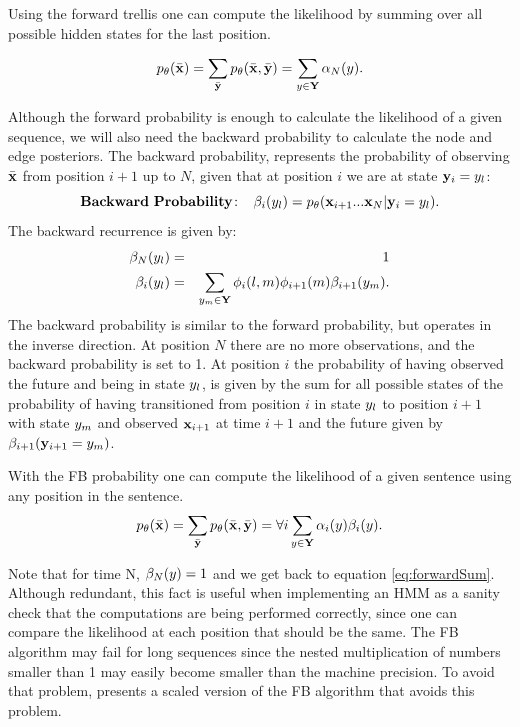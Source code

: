 Using the forward trellis one can compute the likelihood by summing
over all possible hidden states for the last position.

\begin{equation}
\label{eq:forwardSum}
p_{\theta}(\bar{\mathbf{x}}) = \displaystyle \sum_{\bar{\mathbf{y}}} p_{\theta}(\bar{\mathbf{x}} ,\bar{\mathbf{y}}) = \displaystyle \sum_{{y} \in \mathbf{Y}} \alpha_N({y}) .
\end{equation}

Although the forward probability is enough to calculate the likelihood
of a given sequence, we will also need the backward probability to
calculate the node and edge posteriors. The backward probability,
represents the probability of observing $\bar{\mathbf{x}}$ from position $i+1$ up to $N$, given that at position $i$ we are at state $\mathbf{y}_i = {y}_l$:
 \begin{equation}
\label{eq::backward}
\mathbf{Backward \ Probability\!:}\;\;\;\;  \beta_i({y}_l) = p_{\theta}(\mathbf{x}_{i+1}...\mathbf{x}_N | \mathbf{y}_i = {y}_l).
\end{equation}
The backward recurrence is given by:
\begin{eqnarray}
\beta_N({y}_l) &=& 1 \\
\beta_i({y}_l) &=& \displaystyle \sum_{{y}_m \in \mathbf{Y}} \phi_i(l,m)\phi_{i+1}(m) \beta_{i+1}({y}_m).
\end{eqnarray}
The backward probability is similar to the forward probability, but operates in the inverse direction.
At position $N$ there are no more observations, and the backward
probability is set to 1. At position $i$ the probability 
of having observed the future and being in state ${y}_l$, is given by the sum for all possible states of the probability of having transitioned 
from position $i$ in state ${y}_l$ to position $i+1$ with state ${y}_m$ and observed $\mathbf{x}_{i+1}$ at time $i+1$ and the future given by  $\beta_{i+1}(\mathbf{y}_{i+1} = {y}_m)$. 

With the FB probability one can compute the likelihood of a given sentence using any position in the sentence.
\begin{equation}
\label{eq::fbsanity}
  p_{\theta}(\bar{\mathbf{x}}) = \displaystyle \sum_{\bar{\mathbf{y}}} p_{\theta}(\bar{\mathbf{x}} ,\bar{\mathbf{y}}) =  \forall{i}
  \displaystyle \sum_{{y} \in \mathbf{Y}} \alpha_i({y}) \beta_i({y}).
\end{equation}

Note that for time N, $\beta_N({y}) = 1$ and we get back to equation
\ref{eq:forwardSum}. Although redundant, this fact is useful when implementing an
HMM as a sanity check that the computations are being performed
correctly, since one can compare the likelihood at each position that
should be the same. The FB algorithm may fail for long
sequences since the nested multiplication of numbers smaller than 1
may easily become smaller than the machine precision. To avoid that
problem, \cite{rabiner} presents a scaled version of the FB algorithm that avoids this problem.

